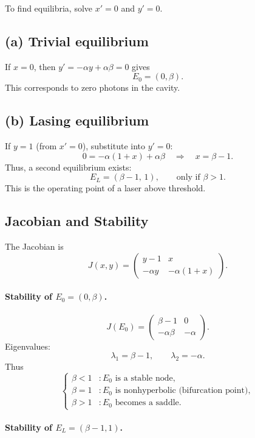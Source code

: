 \documentclass[11pt]{amsart}
\begin{document}
To find equilibria, solve $x'=0$ and $y'=0$.

\subsection{(a) Trivial equilibrium}

If $x=0$, then $y' = -\alpha y + \alpha \beta = 0$ gives
\[
E_0 = (0, \beta).
\]
This corresponds to zero photons in the cavity.

\subsection{(b) Lasing equilibrium}

If $y=1$ (from $x'=0$), substitute into $y'=0$:
\[
0 = -\alpha(1+x) + \alpha \beta
    \quad\Rightarrow\quad
x = \beta - 1.
\]
Thus, a second equilibrium exists:
\[
E_L = (\beta-1,\,1), \qquad \text{only if } \beta > 1.
\]
This is the operating point of a laser above threshold.

\subsection{Jacobian and Stability}

The Jacobian is
\[
J(x,y)=
\begin{pmatrix}
y-1 & x \\
-\alpha y & -\alpha(1+x)
\end{pmatrix}.
\]

\paragraph{Stability of $E_0=(0,\beta)$.}
\[
J(E_0)=
\begin{pmatrix}
\beta-1 & 0 \\
-\alpha\beta & -\alpha
\end{pmatrix}.
\]
Eigenvalues:
\[
\lambda_1=\beta-1,\qquad \lambda_2=-\alpha.
\]
Thus
\[
\begin{cases}
\beta<1 &: \text{$E_0$ is a stable node},\\
\beta=1 &: \text{$E_0$ is nonhyperbolic (bifurcation point)},\\
\beta>1 &: \text{$E_0$ becomes a saddle}.
\end{cases}
\]

\paragraph{Stability of $E_L = (\beta-1,1)$.}
\end{document}
